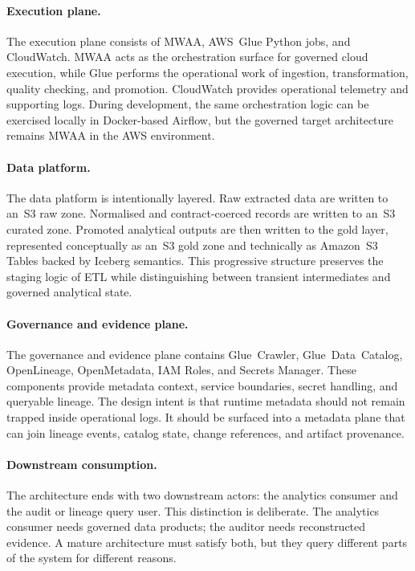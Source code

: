 \paragraph{Execution plane.}
The execution plane consists of MWAA, AWS~Glue Python jobs, and CloudWatch.
MWAA acts as the orchestration surface for governed cloud execution, while Glue
performs the operational work of ingestion, transformation, quality checking,
and promotion. CloudWatch provides operational telemetry and supporting logs.
During development, the same orchestration logic can be exercised locally in
Docker-based Airflow, but the governed target architecture remains MWAA in the
AWS environment.

\paragraph{Data platform.}
The data platform is intentionally layered. Raw extracted data are written to
an~S3 raw zone. Normalised and contract-coerced records are written to an~S3
curated zone. Promoted analytical outputs are then written to the gold layer,
represented conceptually as an~S3 gold zone and technically as Amazon~S3
Tables backed by Iceberg semantics. This progressive structure preserves the
staging logic of ETL while distinguishing between transient intermediates and
governed analytical state.

\paragraph{Governance and evidence plane.}
The governance and evidence plane contains Glue~Crawler, Glue~Data~Catalog,
OpenLineage, OpenMetadata, IAM Roles, and Secrets Manager. These components
provide metadata context, service boundaries, secret handling, and queryable
lineage. The design intent is that runtime metadata should not remain trapped
inside operational logs. It should be surfaced into a metadata plane that can
join lineage events, catalog state, change references, and artifact
provenance.

\paragraph{Downstream consumption.}
The architecture ends with two downstream actors: the analytics consumer and
the audit or lineage query user. This distinction is deliberate. The analytics
consumer needs governed data products; the auditor needs reconstructed
evidence. A mature architecture must satisfy both, but they query different
parts of the system for different reasons.

